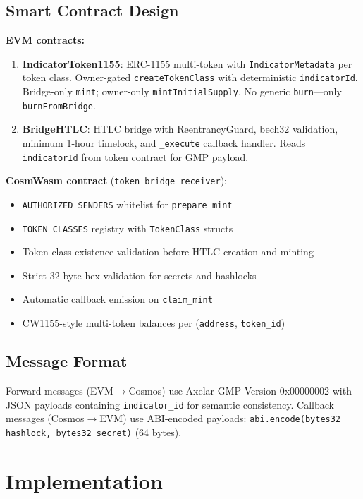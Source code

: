 \documentclass[conference,10pt]{IEEEtran}
\begin{document}
\subsection{Smart Contract Design}

\textbf{EVM contracts:}
\begin{enumerate}
    \item \textbf{IndicatorToken1155}: ERC-1155 multi-token with \texttt{IndicatorMetadata} per token class. Owner-gated \texttt{createTokenClass} with deterministic \texttt{indicatorId}. Bridge-only \texttt{mint}; owner-only \texttt{mintInitialSupply}. No generic \texttt{burn}---only \texttt{burnFromBridge}.
    \item \textbf{BridgeHTLC}: HTLC bridge with ReentrancyGuard, bech32 validation, minimum 1-hour timelock, and \texttt{\_execute} callback handler. Reads \texttt{indicatorId} from token contract for GMP payload.
\end{enumerate}

\textbf{CosmWasm contract} (\texttt{token\_bridge\_receiver}):
\begin{itemize}
    \item \texttt{AUTHORIZED\_SENDERS} whitelist for \texttt{prepare\_mint}
    \item \texttt{TOKEN\_CLASSES} registry with \texttt{TokenClass} structs
    \item Token class existence validation before HTLC creation and minting
    \item Strict 32-byte hex validation for secrets and hashlocks
    \item Automatic callback emission on \texttt{claim\_mint}
    \item CW1155-style multi-token balances per (\texttt{address}, \texttt{token\_id})
\end{itemize}

\subsection{Message Format}

Forward messages (EVM$\to$Cosmos) use Axelar GMP Version 0x00000002 with JSON payloads containing \texttt{indicator\_id} for semantic consistency. Callback messages (Cosmos$\to$EVM) use ABI-encoded payloads: \texttt{abi.encode(bytes32 hashlock, bytes32 secret)} (64 bytes).

\section{Implementation}
\label{sec:implementation}
\end{document}

